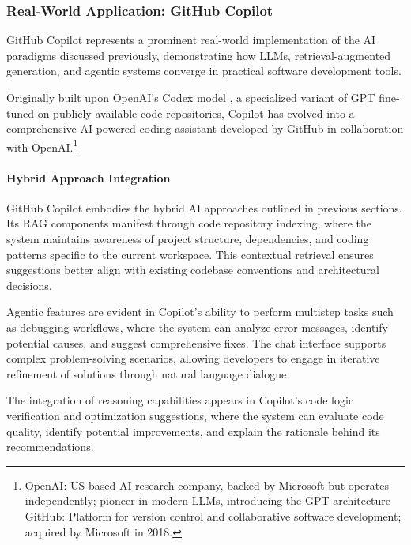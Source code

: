 \def\sectitle{Real-World Application: GitHub Copilot}
\subsubsection[\sectitle]{\sectitle{} \cite{copilot-product-page}\cite{copilot-docs}}

GitHub Copilot represents a prominent real-world implementation of the AI paradigms discussed previously, demonstrating how LLMs, retrieval-augmented generation, and agentic systems converge in practical software development tools.

Originally built upon OpenAI's Codex model \cite{codex-paper}, a specialized variant of GPT fine-tuned on publicly available code repositories, Copilot has evolved into a comprehensive AI-powered coding assistant developed by GitHub in collaboration with OpenAI.\footnote{%
    OpenAI: US-based AI research company, backed by Microsoft but operates independently; pioneer in modern LLMs, introducing the GPT architecture \cite{gpt-family-paper}\\
    GitHub: Platform for version control and collaborative software development; acquired by Microsoft in 2018.
}

\vspace{-0.8\baselineskip}
\paragraph{Hybrid Approach Integration}
GitHub Copilot embodies the hybrid AI approaches outlined in previous sections.
Its RAG components manifest through code repository indexing, where the system maintains awareness of project structure, dependencies, and coding patterns specific to the current workspace.
This contextual retrieval ensures suggestions better align with existing codebase conventions and architectural decisions.

Agentic features are evident in Copilot's ability to perform multistep tasks such as debugging workflows, where the system can analyze error messages, identify potential causes, and suggest comprehensive fixes.
The chat interface supports complex problem-solving scenarios, allowing developers to engage in iterative refinement of solutions through natural language dialogue.

The integration of reasoning capabilities appears in Copilot's code logic verification and optimization suggestions, where the system can evaluate code quality, identify potential improvements, and explain the rationale behind its recommendations.

